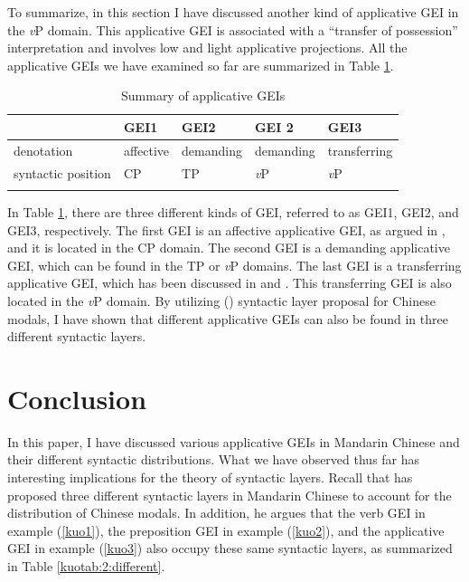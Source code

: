 \documentclass[output=paper,colorlinks,citecolor=brown]{langscibook}
\begin{document}
To summarize, in this section I have discussed another kind of applicative GEI in the \textit{v}P domain. This applicative GEI is associated with a ``transfer of possession'' interpretation and involves low and light applicative projections. All the applicative GEIs we have examined so far are summarized in Table \ref{kuotab:1:three}.

\begin{table}
\caption{Summary of applicative GEIs}
\label{kuotab:1:three}
 \begin{tabular}{lllll} 
  \lsptoprule
            & GEI1 & GEI2 & GEI 2 & GEI3\\ 
  \midrule
  denotation  &  affective &  demanding &  demanding  & transferring\\
  syntactic position  & CP & TP & \textit{v}P & \textit{v}P\\
  \lspbottomrule
 \end{tabular}
\end{table}

In Table \ref{kuotab:1:three}, there are three different kinds of GEI, referred to as GEI1, GEI2, and GEI3, respectively. The first GEI is an affective applicative GEI, as argued in \citet{Tsai2017}, and it is located in the CP domain. The second GEI is a demanding applicative GEI, which can be found in the TP or \textit{v}P domains. The last GEI is a transferring applicative GEI, which has been discussed in \citet{Paul&Whitman2010} and \citet{Kuo2016}. This transferring GEI is also located in the \textit{v}P domain. By utilizing  (\citeyear{Tsai2015b}) syntactic layer proposal for Chinese modals, I have shown that different applicative GEIs can also be found in three different syntactic layers.

\section{Conclusion}\label{sect6}

In this paper, I have discussed various applicative GEIs in Mandarin Chinese and their different syntactic distributions. What we have observed thus far has interesting implications for the theory of syntactic layers. Recall that \citet{Tsai2017} has proposed three different syntactic layers in Mandarin Chinese to account for the distribution of Chinese modals. In addition, he argues that the verb GEI in example (\ref{kuo1}), the preposition GEI in example (\ref{kuo2}), and the applicative GEI in example (\ref{kuo3}) also occupy these same syntactic layers, as summarized in Table \ref{kuotab:2:different}.
\end{document}
